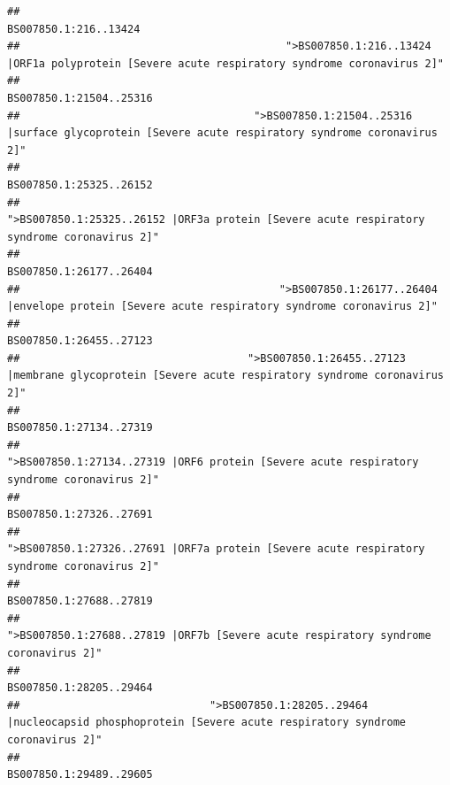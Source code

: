 \documentclass[
]{article}
\begin{document}
\begin{verbatim}
##                                                                                                                  BS007850.1:216..13424 
##                                          ">BS007850.1:216..13424 |ORF1a polyprotein [Severe acute respiratory syndrome coronavirus 2]" 
##                                                                                                                BS007850.1:21504..25316 
##                                     ">BS007850.1:21504..25316 |surface glycoprotein [Severe acute respiratory syndrome coronavirus 2]" 
##                                                                                                                BS007850.1:25325..26152 
##                                            ">BS007850.1:25325..26152 |ORF3a protein [Severe acute respiratory syndrome coronavirus 2]" 
##                                                                                                                BS007850.1:26177..26404 
##                                         ">BS007850.1:26177..26404 |envelope protein [Severe acute respiratory syndrome coronavirus 2]" 
##                                                                                                                BS007850.1:26455..27123 
##                                    ">BS007850.1:26455..27123 |membrane glycoprotein [Severe acute respiratory syndrome coronavirus 2]" 
##                                                                                                                BS007850.1:27134..27319 
##                                             ">BS007850.1:27134..27319 |ORF6 protein [Severe acute respiratory syndrome coronavirus 2]" 
##                                                                                                                BS007850.1:27326..27691 
##                                            ">BS007850.1:27326..27691 |ORF7a protein [Severe acute respiratory syndrome coronavirus 2]" 
##                                                                                                                BS007850.1:27688..27819 
##                                                    ">BS007850.1:27688..27819 |ORF7b [Severe acute respiratory syndrome coronavirus 2]" 
##                                                                                                                BS007850.1:28205..29464 
##                              ">BS007850.1:28205..29464 |nucleocapsid phosphoprotein [Severe acute respiratory syndrome coronavirus 2]" 
##                                                                                                                BS007850.1:29489..29605 

\end{verbatim}
\end{document}
